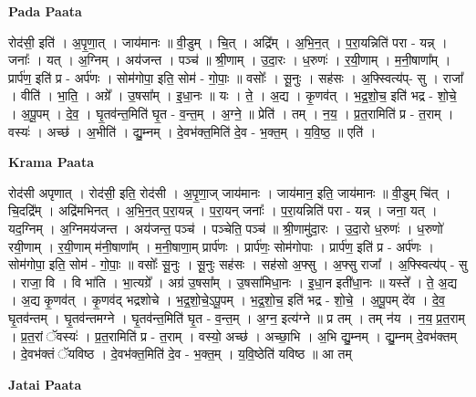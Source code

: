 \documentclass[17pt]{extarticle}
\begin{document}
\textbf{Pada Paata} \newline

रोद॑सी॒ इति॑ । अ॒पृ॒णा॒त् । जाय॑मानः ॥ वी॒डुम् । चि॒त् । अद्रि᳚म् । अ॒भि॒न॒त् । प॒रा॒यन्निति॑ परा - यन्न् । जनाः᳚ । यत् । अ॒ग्निम् । अय॑जन्त । पञ्च॑ ॥ श्री॒णाम् । उ॒दा॒रः । ध॒रुणः॑ । र॒यी॒णाम् । म॒नी॒षाणा᳚म् । प्रार्प॑ण॒ इति॑ प्र - अर्प॑णः । सोम॑गोपा॒ इति॒ सोम॑ - गो॒पाः॒ ॥ वसोः᳚ । सू॒नुः । सह॑सः । अ॒फ्स्वित्य॑प्- सु । राजा᳚ । वीति॑ । भा॒ति॒ । अग्रे᳚ । उ॒षसा᳚म् । इ॒धा॒नः ॥ यः । ते॒ । अ॒द्य । कृ॒णव॑त् । भ॒द्र॒शो॒च॒ इति॑ भद्र - शो॒चे॒ । अ॒पू॒पम् । दे॒व॒ । घृ॒तव॑न्त॒मिति॑ घृ॒त - व॒न्त॒म् । अ॒ग्ने॒ ॥ प्रेति॑ । तम् । न॒य॒ । प्र॒त॒रामिति॑ प्र - त॒राम् । वस्यः॑ । अच्छ॑ । अ॒भीति॑ । द्यु॒म्नम् । दे॒वभ॑क्त॒मिति॑ दे॒व - भ॒क्त॒म् । य॒वि॒ष्ठ॒ ॥ एति॑ ।  \newline


\textbf{Krama Paata} \newline

रोद॑सी अपृणात् । रोद॑सी॒ इति॒ रोद॑सी । अ॒पृ॒णा॒ज् जाय॑मानः । जाय॑मान॒ इति॒ जाय॑मानः ॥ वी॒डुम् चि॑त् । चि॒दद्रि᳚म् । अद्रि॑मभिनत् । अ॒भि॒न॒त् प॒रा॒यन्न् । प॒रा॒यन् जनाः᳚ । प॒रा॒यन्निति॑ परा - यन्न् । जना॒ यत् । यद॒ग्निम् । अ॒ग्निमय॑जन्त । अय॑जन्त॒ पञ्च॑ । पञ्चेति॒ पञ्च॑ ॥ श्री॒णामु॑दा॒रः । उ॒दा॒रो ध॒रुणः॑ । ध॒रुणो॑ रयी॒णाम् । र॒यी॒णाम् म॑नी॒षाणा᳚म् । म॒नी॒षाणा॒म् प्रार्प॑णः । प्रार्प॑णः॒ सोम॑गोपाः । प्रार्प॑ण॒ इति॑ प्र - अर्प॑णः । सोम॑गोपा॒ इति॒ सोम॑ - गो॒पाः॒ ॥ वसोः᳚ सू॒नुः । सू॒नुः सह॑सः । सह॑सो अ॒फ्सु । अ॒फ्सु राजा᳚ । अ॒फ्स्वित्य॑प् - सु । राजा॒ वि । वि भा॑ति । भा॒त्यग्रे᳚ । अग्र॑ उ॒षसा᳚म् । उ॒षसा॑मिधा॒नः । इ॒धा॒न इती॑धा॒नः ॥ यस्ते᳚ । ते॒ अ॒द्य । अ॒द्य कृ॒णव॑त् । कृ॒णव॑द् भद्रशोचे । भ॒द्र॒शो॒चे॒ऽपू॒पम् । भ॒द्र॒शो॒च॒ इति॑ भद्र - शो॒चे॒ । अ॒पू॒पम् दे॑व । दे॒व॒ घृ॒तव॑न्तम् । घृ॒तव॑न्तमग्ने । घृ॒तव॑न्त॒मिति॑ घृ॒त - व॒न्त॒म् । अ॒ग्न॒ इत्य॑ग्ने ॥ प्र तम् । तम् न॑य । न॒य॒ प्र॒त॒राम् । प्र॒त॒रां ॅवस्यः॑ । प्र॒त॒रामिति॑ प्र - त॒राम् । वस्यो॒ अच्छ॑ । अच्छा॒भि । अ॒भि द्यु॒म्नम् । द्यु॒म्नम् दे॒वभ॑क्तम् । दे॒वभ॑क्तं ॅयविष्ठ । दे॒वभ॑क्त॒मिति॑ दे॒व - भ॒क्त॒म् । य॒वि॒ष्ठेति॑ यविष्ठ ॥ आ तम् \newline

\textbf{Jatai Paata} \newline
\end{document}
